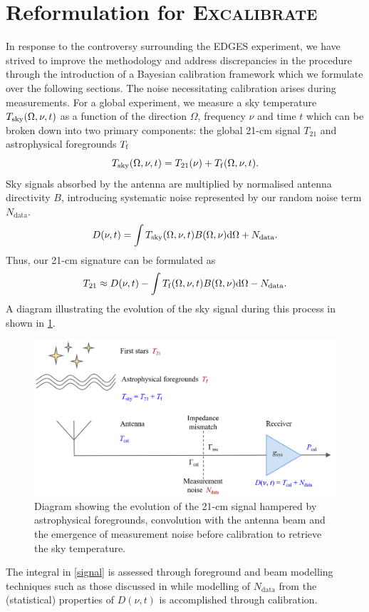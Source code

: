 \section{Reformulation for \textsc{Excalibrate}}\label{sec:reach_formalism}
 In response to the controversy surrounding the EDGES experiment, we have strived to improve the methodology and address discrepancies in the procedure through the introduction of a Bayesian calibration framework which we formulate over the following sections. The noise necessitating calibration arises during measurements. For a global experiment, we measure a sky temperature $T_{\mathrm{sky}}(\Omega, \nu, t)$ as a function of the direction $\Omega$, frequency $\nu$ and time $t$ which can be broken down into two primary components: the global 21-cm signal $T_{21}$ and astrophysical foregrounds $T_{\mathrm{f}}$
\begin{equation}
    \label{tsky}
    T_{\mathrm{sky}}(\Omega, \nu, t) = T_{21}(\nu) + T_{\mathrm{f}}(\Omega, \nu, t).
\end{equation}
Sky signals absorbed by the antenna are multiplied by normalised antenna directivity $B$, introducing systematic noise represented by our random noise term $N_{\mathrm{data}}$.
\begin{equation}\label{eqn:bayestsource}
    D(\nu, t) = \int T_{\mathrm{sky}}(\Omega, \nu, t) B(\Omega, \nu)\mathrm{d}\Omega + N_{\mathrm{data}}.
\end{equation}
Thus, our 21-cm signature can be formulated as
\begin{equation}\label{signal}
  T_{21} \approx D(\nu, t) - \int T_{\mathrm{f}}(\Omega, \nu, t)B(\Omega, \nu)\mathrm{d}\Omega - N_{\mathrm{data}}.
\end{equation}
A diagram illustrating the evolution of the sky signal during this process in shown in \cref{fig:nsfig}.
\begin{figure}
    \centering
    \includegraphics[width=.7\textwidth]{nsdiag}
    \caption{Diagram showing the evolution of the 21-cm signal hampered by astrophysical foregrounds, convolution with the antenna beam and the emergence of measurement noise before calibration to retrieve the sky temperature.}
    \label{fig:nsfig}
\end{figure}
The integral in \cref{signal} is assessed through foreground and beam modelling techniques such as those discussed in \citet{dom} while modelling of $N_{\mathrm{data}}$ from the (statistical) properties of $D(\nu, t)$ is accomplished through calibration.


